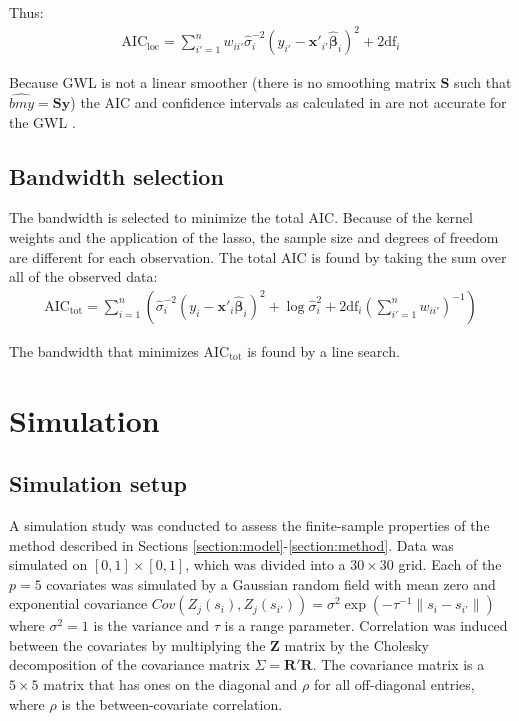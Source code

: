 \documentclass[authoryear, review, 11pt]{elsarticle}
\begin{document}
	Thus:
	\begin{eqnarray}
		\mbox{AIC}_{\mbox{loc}} = \sum_{i'=1}^n w_{ii'} \hat{\sigma}_i^{-2} \left( y_{i'} - \bm{x}'_{i'} \hat{\bm{\beta}}_i \right)^2 + 2 \mbox{df}_i
	\end{eqnarray}

	Because GWL is not a linear smoother (there is no smoothing matrix $\bm{S}$ such that $\hat{bm{y}} = \bm{S} \bm{y}$) the AIC and confidence intervals as calculated in \cite{Fotheringham:2002} are not accurate for the GWL \citep{Zou:2006}.

	\subsection{Bandwidth selection}
		The bandwidth is selected to minimize the total AIC. Because of the kernel weights and the application of the lasso, the sample size and degrees of freedom are different for each observation. The total AIC is found by taking the sum over all of the observed data:\\
		
		\begin{eqnarray}
			\mbox{AIC}_{\mbox{tot}} = \sum_{i=1}^n \left( \hat{\sigma}_i^{-2} \left( y_i - \bm{x}'_i \hat{\bm{\beta}}_i \right)^2 + \log \hat{\sigma}_i^2 + 2 \mbox{df}_i \left(\sum_{i'=1}^n w_{ii'} \right)^{-1} \right)
		\end{eqnarray}
			
			The bandwidth that minimizes $\mbox{AIC}_{\mbox{tot}}$ is found by a line search.\\
			
\section{Simulation}
	\subsection{Simulation setup}
		A simulation study was conducted to assess the finite-sample properties of the method described in Sections \ref{section:model}-\ref{section:method}. Data was simulated on $[0,1] \times [0,1]$, which was divided into a $30 \times 30$ grid. Each of the $p=5$ covariates was simulated by a Gaussian random field with mean zero and exponential covariance $Cov \left(Z_j(s_i), Z_j(s_{i'}) \right) = \sigma^2 \exp{\left( -\tau^{-1} \|s_i - s_{i'} \| \right)}$ where $\sigma^2=1$ is the variance and $\tau$ is a range parameter. Correlation was induced between the covariates by multiplying the $\bm{Z}$ matrix by the Cholesky decomposition of the covariance matrix $\Sigma = \bm{R}'\bm{R}$. The covariance matrix is a $5 \times 5$ matrix that has ones on the diagonal and $\rho$ for all off-diagonal entries, where $\rho$ is the between-covariate correlation.\\
		
\end{document}
